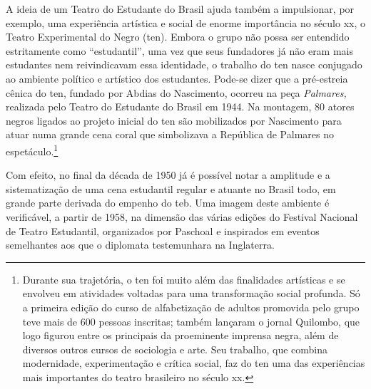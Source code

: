 {A ideia de um Teatro do Estudante do Brasil ajuda também a impulsionar,
por exemplo, uma experiência artística e social de enorme importância no
século {\sc xx}, o Teatro Experimental do Negro ({\sc ten}). Embora o grupo não
possa ser entendido estritamente como “estudantil”, uma vez que seus
fundadores já não eram mais estudantes nem reivindicavam essa
identidade, o trabalho do {\sc ten} nasce conjugado ao ambiente político e
artístico dos estudantes. Pode-se dizer que a pré-estreia cênica do {\sc ten},
fundado por Abdias do Nascimento, ocorreu na peça {\it Palmares,}
realizada pelo Teatro do Estudante do Brasil em 1944. Na montagem, 80
atores negros ligados ao projeto inicial do {\sc ten} são mobilizados por
Nascimento para atuar numa grande cena coral que simbolizava a República
de Palmares no espetáculo.\footnote{Durante sua trajetória, o {\sc ten} foi
  muito além das finalidades artísticas e se envolveu em atividades
  voltadas para uma transformação social profunda. Só a primeira edição
  do curso de alfabetização de adultos promovida pelo grupo teve mais de
  600 pessoas inscritas; também lançaram o jornal Quilombo, que logo
  figurou entre os principais da proeminente imprensa negra, além de
  diversos outros cursos de sociologia e arte. Seu trabalho, que combina
  modernidade, experimentação e crítica social, faz do {\sc ten} uma das
  experiências mais importantes do teatro brasileiro no século {\sc xx}.}

Com efeito, no final da década de 1950 já é possível notar a amplitude e
a sistematização de uma cena estudantil regular e atuante no Brasil
todo, em grande parte derivada do empenho do {\sc teb}. Uma imagem deste
ambiente é verificável, a partir de 1958, na dimensão das várias edições
do Festival Nacional de Teatro Estudantil, organizados por Paschoal e
inspirados em eventos semelhantes aos que o diplomata testemunhara na
Inglaterra.

}
